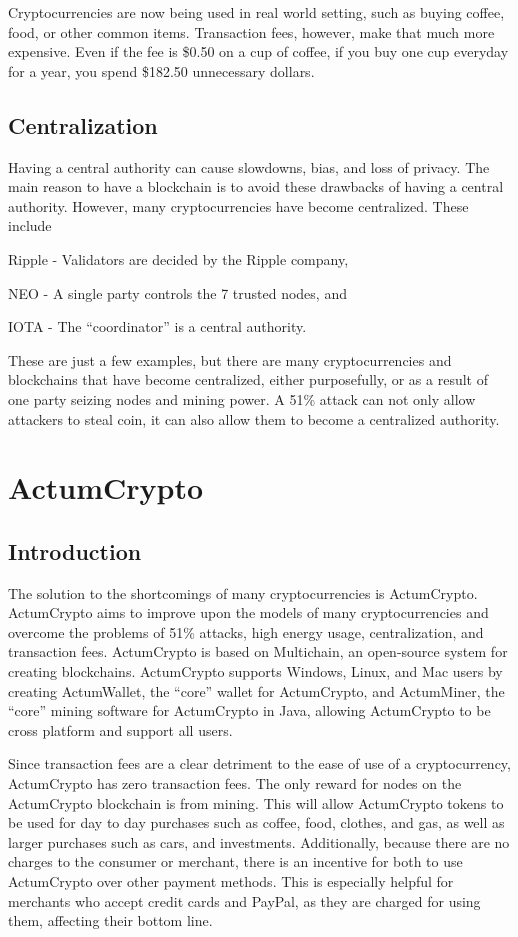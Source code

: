 \documentclass[letter]{article}
\begin{document}
Cryptocurrencies are now being used in real world setting, such as buying coffee, food, or other common items. Transaction fees, however, make that much more expensive. Even if the fee is \$0.50 on a cup of coffee, if you buy one cup everyday for a year, you spend \$182.50 unnecessary dollars.

\subsection{Centralization}
Having a central authority can cause slowdowns, bias, and loss of privacy. The main reason to have a blockchain is to avoid these drawbacks of having a central authority. However, many cryptocurrencies have become centralized. These include \begin{enumerate*}[label=(\alph*)]\item Ripple - Validators are decided by the Ripple company, \item NEO - A single party controls the 7 trusted nodes, and \item IOTA - The “coordinator” is a central authority.\end{enumerate*} These are just a few examples, but there are many cryptocurrencies and blockchains that have become centralized, either purposefully, or as a result of one party seizing nodes and mining power. A 51\% attack can not only allow attackers to steal coin, it can also allow them to become a centralized authority.

\section{ActumCrypto}
\subsection{Introduction}
The solution to the shortcomings of many cryptocurrencies is ActumCrypto. ActumCrypto aims to improve upon the models of many cryptocurrencies and overcome the problems of 51\% attacks, high energy usage, centralization, and transaction fees. ActumCrypto is based on Multichain, an open-source system for creating blockchains. ActumCrypto supports Windows, Linux, and Mac users by creating ActumWallet, the “core” wallet for ActumCrypto, and ActumMiner, the “core” mining software for ActumCrypto in Java, allowing ActumCrypto to be cross platform and support all users.

Since transaction fees are a clear detriment to the ease of use of a cryptocurrency, ActumCrypto has zero transaction fees. The only reward for nodes on the ActumCrypto blockchain is from mining. This will allow ActumCrypto tokens to be used for day to day purchases such as coffee, food, clothes, and gas, as well as larger purchases such as cars, and investments. Additionally, because there are no charges to the consumer or merchant, there is an incentive for both to use ActumCrypto over other payment methods. This is especially helpful for merchants who accept credit cards and PayPal, as they are charged for using them, affecting their bottom line.
\end{document}
